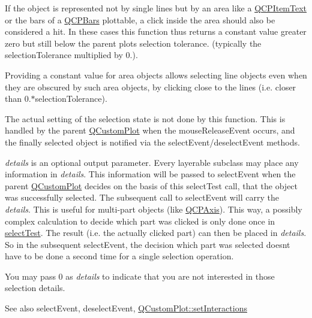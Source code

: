 If the object is represented not by single lines but by an area like a \hyperlink{class_q_c_p_item_text}{Q\+C\+P\+Item\+Text} or the bars of a \hyperlink{class_q_c_p_bars}{Q\+C\+P\+Bars} plottable, a click inside the area should also be considered a hit. In these cases this function thus returns a constant value greater zero but still below the parent plot\textquotesingle{}s selection tolerance. (typically the selection\+Tolerance multiplied by 0.).

Providing a constant value for area objects allows selecting line objects even when they are obscured by such area objects, by clicking close to the lines (i.\+e. closer than 0.$\ast$selection\+Tolerance).

The actual setting of the selection state is not done by this function. This is handled by the parent \hyperlink{class_q_custom_plot}{Q\+Custom\+Plot} when the mouse\+Release\+Event occurs, and the finally selected object is notified via the select\+Event/deselect\+Event methods.

{\itshape details} is an optional output parameter. Every layerable subclass may place any information in {\itshape details}. This information will be passed to select\+Event when the parent \hyperlink{class_q_custom_plot}{Q\+Custom\+Plot} decides on the basis of this select\+Test call, that the object was successfully selected. The subsequent call to select\+Event will carry the {\itshape details}. This is useful for multi-\/part objects (like \hyperlink{class_q_c_p_axis}{Q\+C\+P\+Axis}). This way, a possibly complex calculation to decide which part was clicked is only done once in \hyperlink{class_q_c_p_layerable_a04db8351fefd44cfdb77958e75c6288e}{select\+Test}. The result (i.\+e. the actually clicked part) can then be placed in {\itshape details}. So in the subsequent select\+Event, the decision which part was selected doesn\textquotesingle{}t have to be done a second time for a single selection operation.

You may pass 0 as {\itshape details} to indicate that you are not interested in those selection details.

\begin{DoxySeeAlso}{See also}
select\+Event, deselect\+Event, \hyperlink{class_q_custom_plot_a5ee1e2f6ae27419deca53e75907c27e5}{Q\+Custom\+Plot\+::set\+Interactions} 
\end{DoxySeeAlso}


